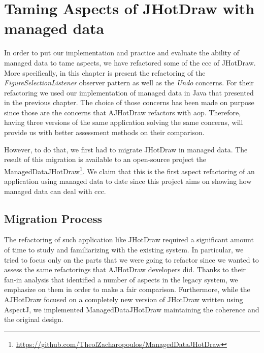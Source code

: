 
\chapter{Taming Aspects of JHotDraw \newline with managed data}\label{AspectRefactoring}

In order to put our implementation and practice and evaluate the ability of managed data to tame aspects, we have refactored some of the \ac{ccc} of JHotDraw.
More specifically, in this chapter is present the refactoring of the \textit{FigureSelectionListener} observer pattern as well as the \textit{Undo} concerns.
For their refactoring we used our implementation of managed data in Java that presented in the previous chapter.
The choice of those concerns has been made on purpose since those are the concerns that AJHotDraw refactors with \ac{aop}.
Therefore, having three versions of the same application solving the same concerns, will provide us with better assessment methods on their comparison.

However, to do that, we first had to migrate JHotDraw in managed data.
The result of this migration is available to an open-source project the ManagedDataJHotDraw\footnote{\url{https://github.com/TheolZacharopoulos/ManagedDataJHotDraw}}.
We claim that this is the first aspect refactoring of an application using managed data to date since this project aims on showing how managed data can deal with \ac{ccc}.

\section{Migration Process}
The refactoring of such application like JHotDraw required a significant amount of time to study and familiarizing with the existing system.
In particular, we tried to focus only on the parts that we were going to refactor since we wanted to assess the same refactorings that AJHotDraw developers \cite{marinajhotdraw} did.
Thanks to their fan-in analysis \cite{marin2004identifying} that identified a number of aspects in the legacy system, we emphasize on them in order to make a fair comparison.
Furthermore, while the AJHotDraw focused on a completely new version of JHotDraw written using AspectJ, we implemented ManagedDataJHotDraw maintaining the coherence and the original design.

